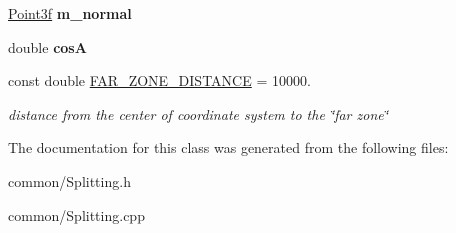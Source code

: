 \begin{DoxyCompactItemize}
\mbox{\hyperlink{struct_point3f}{Point3f}} {\bfseries m\+\_\+normal}
\item 
\mbox{\label{class_splitting_a5ad3670ea5bad3271257b1a1b172c6e2}} 
double {\bfseries cosA}
\item 
\mbox{\label{class_splitting_a414e93aea45af1e8ce0cebcfb977a077}} 
const double \mbox{\hyperlink{class_splitting_a414e93aea45af1e8ce0cebcfb977a077}{F\+A\+R\+\_\+\+Z\+O\+N\+E\+\_\+\+D\+I\+S\+T\+A\+N\+CE}} = 10000.
\begin{DoxyCompactList}\small\item\em distance from the center of coordinate system to the \char`\"{}far zone\char`\"{} \end{DoxyCompactList}\end{DoxyCompactItemize}


The documentation for this class was generated from the following files\+:\begin{DoxyCompactItemize}
\item 
common/Splitting.\+h\item 
common/Splitting.\+cpp\end{DoxyCompactItemize}
